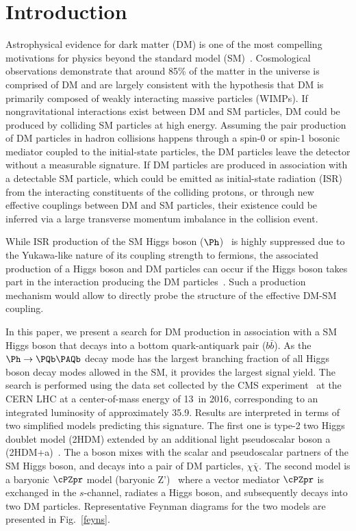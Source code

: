 \section{Introduction} \label{intro}

Astrophysical evidence for dark matter (DM) is one of the most compelling motivations for
physics beyond the standard model
(SM)~\cite{dm1,dm2,dm3}. Cosmological observations demonstrate that
around 85\% of the matter in the universe is comprised of DM
\cite{planck} and are largely consistent with the hypothesis that DM is primarily composed of
weakly interacting massive particles (WIMPs). If nongravitational
interactions exist between DM and SM particles, DM could be produced
by colliding SM particles at high energy. Assuming the pair
production of DM particles in hadron collisions happens through a
spin-0 or spin-1 bosonic mediator coupled to the initial-state particles, the DM particles leave the
detector without a measurable signature. If DM particles are produced in association with a detectable SM particle, which could be emitted
as initial-state radiation (ISR) from the interacting constituents of the colliding protons, or through
new effective couplings between DM and SM particles, their
existence could be inferred via a large transverse momentum imbalance in the collision event. 


While ISR production of the SM Higgs boson ($\Ph$)~\cite{HiggsObs_ATLAS, HiggsObs_CMS, HiggsObs_CMS_Long} is highly suppressed due to the Yukawa-like nature of its coupling strength to fermions, the associated production of a Higgs boson and DM particles
can occur if the
Higgs boson takes part in the interaction producing the DM particles~\cite{monoHiggs3,2HDM,PhysRevD.89.075017}.
Such a production mechanism would allow to directly probe the structure of the effective DM-SM coupling.

In this paper, we  present a search for DM production in association
with a SM Higgs boson that decays into a bottom quark-antiquark pair ($b\bar{b}$). As the 
$\Ph\rightarrow \bb$ decay mode has the largest branching fraction of all Higgs boson decay modes allowed in the SM, it provides the largest signal yield. The search is performed using the data set collected by the CMS experiment~\cite{CMSdetector} at the CERN LHC at a center-of-mass energy of 13\TeV~in 2016, corresponding to an integrated luminosity of approximately 35.9\fbinv. Results are interpreted in terms of two simplified models predicting this signature. The first one is type-2 two Higgs doublet model (2HDM) extended by an additional light pseudoscalar boson a (2HDM+a)~\cite{Bauer2017}. The a boson mixes with the scalar and pseudoscalar partners of the SM Higgs boson, and decays into a pair of DM particles,  $\chi\bar{\chi}$. The second model is a baryonic $\cPZpr$ model (baryonic Z')~\cite{PhysRevD.89.075017} where a vector mediator $\cPZpr$ is exchanged in the $s$-channel, radiates a Higgs boson, and subsequently decays into two DM 
particles. Representative Feynman diagrams for the two models are presented in Fig.~\ref{feyns}.


